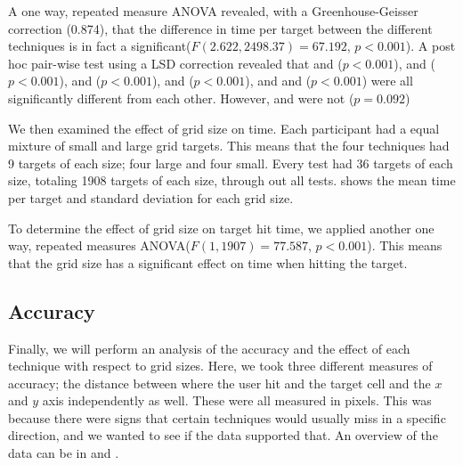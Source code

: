 A one way, repeated measure ANOVA revealed, with a Greenhouse-Geisser correction (0.874), that the difference in time per target between the different techniques is in fact a significant($F(2.622, 2498.37)=67.192$, $p<0.001$). A post hoc pair-wise test using a LSD correction revealed that \pinch and \swipe($p<0.001$), \pinch and \tilt ($p<0.001$), \pinch and \throw ($p<0.001$), \swipe and \throw ($p<0.001$), and \throw and \tilt ($p<0.001$) were all significantly different from each other. However, \swipe and \tilt were not ($p=0.092$)

We then examined the effect of grid size on time. Each participant had a equal mixture of small and large grid targets. This means that the four techniques had 9 targets of each size; four large and four small. Every test had 36 targets of each size, totaling 1908 targets of each size, through out all tests.  shows the mean time per target and standard deviation for each grid size. 

To determine the effect of grid size on target hit time, we applied another one way, repeated measures ANOVA($F(1,1907) = 77.587$, $p<0.001$). This means that the grid size has a significant effect on time when hitting the target. 

\subsection{Accuracy}
Finally, we will perform an analysis of the accuracy and the effect of each technique with respect to grid sizes.
Here, we took three different measures of accuracy; the distance between where the user hit and the target cell and the $x$ and $y$ axis independently as well. 
These were all measured in pixels.
This was because there were signs that certain techniques would usually miss in a specific direction, and we wanted to see if the data supported that. 
An overview of the data can be in  and .


